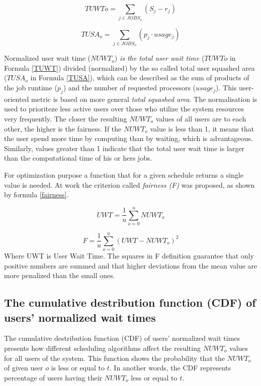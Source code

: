 \documentclass[a4paper,10pt]{article}
\begin{document}
 \begin{equation}
TUWT{o}=\sum\limits_{j \in JOBS_{o}}^{} (S_{j}-r_{j}) 
\label{TUWT}
\end{equation}

 \begin{equation}
TUSA_{o}=\sum\limits_{j \in JOBS_{o}}^{} (p_{j} \cdot usage_{j})
\label{TUSA}
\end{equation}

Normalized user wait time ($NUWT_{o}$) \textit{is the total user wait time} ($TUWT{o}$ in Formula \ref{TUWT}) divided (normalized) by the so called total user squashed area ($TUSA_{o}$ in Formula \ref{TUSA}), which can be described as the sum of products of the job runtime ($p_{j}$) and the number of requested processors ($usage_{j}$). This user-oriented metric is based on more general \textit{total squashed area}. The normalisation is used to prioriteze less active users over those who utilize the system resources very frequently. The closer the resulting $NUWT_{o}$ values of all users are to each other, the higher is the fairness. If the $NUWT_{o}$ value is less than 1, it means that the user spend more time by computing than by waiting, which is advantageous. Similarly, values greater than 1 indicate that the total user wait time is larger than the computational time of his or hers jobs. \cite{Rudova 2012}

For optimization purpose a function that for a given schedule returns a single value is needed. At work \cite{Rudova 2012} the criterion called \textit{fairness (F)} was proposed, as shown by formula \ref{fairness}.

 \begin{equation}
UWT=\frac{1}{u}\sum\limits_{o=0}^{u} NUWT_{o}
\label{UWT}
\end{equation}

 \begin{equation}
F=\frac{1}{u}\sum\limits_{o=0}^{u} (UWT-NUWT_{o})^{2}
\label{fairness}
\end{equation}
Where UWT is User Wait Time. The squares in F definition  guarantee that only positive numbers are summed and that higher deviations from the mean value are more penalized than the small ones. 

\subsection{The cumulative destribution function (CDF) of users' normalized wait times}
The cumulative destribution function (CDF) of users' normalized wait times presents how different scheduling algorithms affect the resulting $NUWT_{o}$ values for all users of the system. This function shows the probability that the $NUWT_{o}$ of given user $o$  is less or equal to $t$. In another words, the CDF represents percentage of users having their $NUWT_{o}$ less or equal to $t$. \cite{Rudova 2012}
\end{document}
